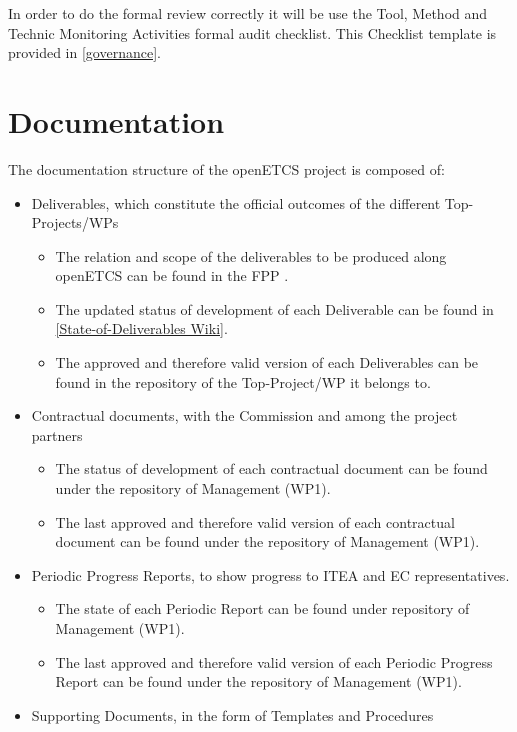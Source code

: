\documentclass{template/openetcs_article}
\begin{document}
In order to do the formal review correctly it will be use the Tool, Method and Technic Monitoring Activities formal audit checklist. This Checklist template is provided in \href{https://github.com/openETCS/governance/tree/master/Templates}{[governance]}.

\section{Documentation}

The documentation structure of the openETCS project is composed of:
\begin{itemize}
\item Deliverables, which constitute the official outcomes of the different Top-Projects/\gls{WP}s
\begin{itemize}
\item The relation and scope of the deliverables to be produced along openETCS can be found in the FPP \citep{fpp}.
\item The updated status of development of each Deliverable can be found in 
\href{https://github.com/openETCS/management/wiki/State-of-Deliverables}{[State-of-Deliverables Wiki]}.
\item The approved and therefore valid version of each Deliverables can be found in the repository of the Top-Project/\gls{WP} it belongs to. 
\end{itemize}
\item Contractual documents, with the Commission and among the project partners
\begin{itemize}
\item The status of development of each contractual document can be found under the repository of Management (WP1).
\item The last approved and therefore valid version of each contractual document can be found under the repository of Management (WP1).
\end{itemize}
\item Periodic Progress Reports, to show progress to ITEA and EC representatives.
\begin{itemize}
\item The state of each Periodic Report can be found under repository of Management (WP1).
\item The last approved and therefore valid version of each Periodic Progress Report can be found under the repository of Management (WP1). 
\end{itemize}
\item Supporting Documents, in the form of Templates and Procedures

\end{itemize}
\end{document}
